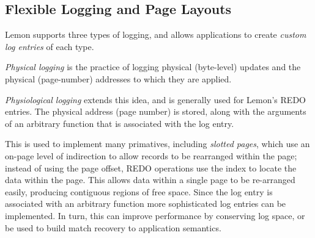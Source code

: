 \documentclass[10pt,letterpaper,twocolumn,english]{article}
\newcommand{\yad}{Lemon\xspace}
\begin{document}
%


\subsection{Flexible Logging and Page Layouts}
\label{flex-logging}
\label{page-layouts}

\yad supports three types of logging, and allows applications to create
{\em custom log entries} of each type.

{\em Physical logging } 
is the practice of logging physical (byte-level) updates
and the physical (page-number) addresses to which they are applied.

{\em Physiological logging } extends this idea, and is generally used 
for \yad's REDO entries.  The physical address (page number) is
stored, along with the arguments of an arbitrary function that 
is associated with the log entry.

This is used to implement many primatives, including {\em slotted pages}, which use
an on-page level of indirection to allow records to be rearranged
within the page; instead of using the page offset, REDO operations use
the index to locate the data within the page. This allows data within a single
page to be re-arranged easily, producing contiguous regions of
free space.  Since the log entry is associated with an arbitrary function
more sophisticated log entries can be implemented.  In turn, this can improve 
performance by conserving log space, or be used to build match recovery to application
semantics.
\end{document}
